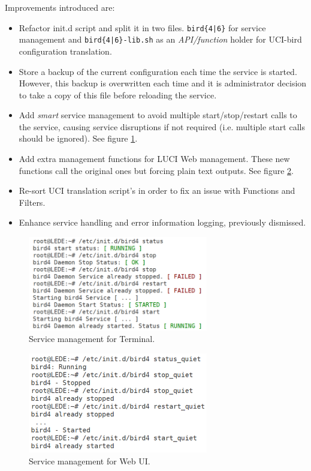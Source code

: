 Improvements introduced are:
\begin{itemize}
    \item Refactor init.d script and split it in two files. \texttt{bird\{4|6\}} for service management and \texttt{bird\{4|6\}-lib.sh} as an \textit{API/function} holder for UCI-bird configuration translation.
    \item Store a backup of the current configuration each time the service is started. However, this backup is overwritten each time and it is administrator decision to take a copy of this file before reloading the service.
    \item Add \textit{smart} service management to avoid multiple start/stop/restart calls to the service, causing service disruptions if not required (i.e. multiple start calls should be ignored). See figure \ref{fig:initdt}.
    \item Add extra management functions for LUCI Web management. These new functions call the original ones but forcing plain text outputs. See figure \ref{fig:initdui}.
    \item Re-sort UCI translation script's in order to fix an issue with Functions and Filters.
    \item Enhance service handling and error information logging, previously dismissed.
\end{itemize}

\begin{figure}[ht!]
    \centering
    \includegraphics[width=0.7\textwidth]{images/initdterminal}
    \caption{Service management for Terminal.}
    \label{fig:initdt}
\end{figure}

\begin{figure}[ht!]
    \centering
    \includegraphics[width=0.7\textwidth]{images/initdui}
    \caption{Service management for Web UI.}
    \label{fig:initdui}
\end{figure}

